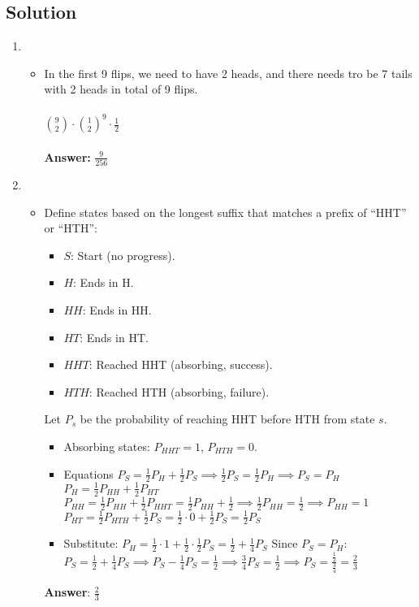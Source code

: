 \documentclass[11pt]{article}
\begin{document}
    \subsection*{Solution}
    \begin{enumerate}[label=(\alph*)]
        \item
        \begin{itemize}
            \item[] In the first 9 flips, we need to have 2 heads, and there needs tro be 7 tails with 2 heads in total of 9 flips. \\ \\
            \(\binom{9}{2} \cdot \binom{1}{2}^9 \cdot \frac{1}{2}\) \\ \\
            \textbf{Answer:} \(\frac{9}{256}\)
        \end{itemize}
        \item
        \begin{itemize}
            \item[] Define states based on the longest suffix that matches a prefix of ``HHT'' or ``HTH'':
\begin{itemize}
    \item[] \( S \): Start (no progress).
    \item[] \( H \): Ends in H.
    \item[] \( HH \): Ends in HH.
    \item[] \( HT \): Ends in HT.
    \item[] \( HHT \): Reached HHT (absorbing, success).
    \item[] \( HTH \): Reached HTH (absorbing, failure).
\end{itemize}


Let \( P_s \) be the probability of reaching HHT before HTH from state \( s \).
\begin{itemize}
    \item [] Absorbing states: \( P_{HHT} = 1 \), \( P_{HTH} = 0 \).
    \item[] Equations
    \(
    P_S = \frac{1}{2} P_H + \frac{1}{2} P_S \implies \frac{1}{2} P_S = \frac{1}{2} P_H \implies P_S = P_H
    \)
    \(
    P_H = \frac{1}{2} P_{HH} + \frac{1}{2} P_{HT}
    \)
    \(
    P_{HH} = \frac{1}{2} P_{HH} + \frac{1}{2} P_{HHT} = \frac{1}{2} P_{HH} + \frac{1}{2} \implies \frac{1}{2} P_{HH} = \frac{1}{2} \implies P_{HH} = 1
    \)
    \(
    P_{HT} = \frac{1}{2} P_{HTH} + \frac{1}{2} P_S = \frac{1}{2} \cdot 0 + \frac{1}{2} P_S = \frac{1}{2} P_S
    \)
    \item [] Substitute:
    \(
    P_H = \frac{1}{2} \cdot 1 + \frac{1}{2} \cdot \frac{1}{2} P_S = \frac{1}{2} + \frac{1}{4} P_S
    \)
    Since \( P_S = P_H \):
    \(
    P_S = \frac{1}{2} + \frac{1}{4} P_S \implies P_S - \frac{1}{4} P_S = \frac{1}{2} \implies \frac{3}{4} P_S = \frac{1}{2} \implies P_S = \frac{\frac{1}{2}}{\frac{3}{4}} = \frac{2}{3}
    \)
\end{itemize}

\textbf{Answer}: \( \frac{2}{3} \)
        \end{itemize}
    \end{enumerate}
\end{document}
